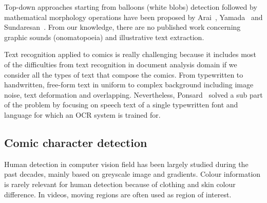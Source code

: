Top-down approaches starting from balloons (white blobs) detection followed by mathematical morphology operations have been proposed by Arai~\cite{Arai11}, Yamada~\cite{Yam04} and Sundaresan~\cite{Sundaresan2012Text}.
From our knowledge, there are no published work concerning graphic sounds (onomatopoeia) and illustrative text extraction.

Text recognition applied to comics is really challenging because it includes most of the difficulties from text recognition in document analysis domain if we consider all the types of text that compose the comics.
From typewritten to handwritten, free-form text in uniform to complex background including image noise, text deformation and overlapping.
Nevertheless, Ponsard~\cite{ponsard2012ocr} solved a sub part of the problem by focusing on speech text of a single typewritten font and language for which an OCR system is trained for.


\subsection{Comic character detection}
\label{sec:sota:comic_character}



Human detection in computer vision field has been largely studied during the past decades, mainly based on greyscale image and gradients.
Colour information is rarely relevant for human detection because of clothing and skin colour difference. In videos, moving regions are often used as region of interest.

